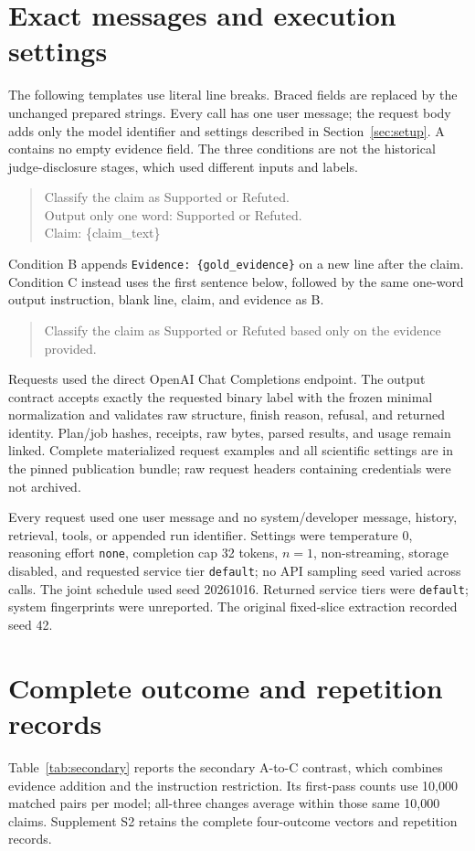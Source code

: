 \documentclass[11pt,letterpaper]{article}
\begin{document}

\clearpage
\appendix
\section{Exact messages and execution settings}\label{app:messages}
The following templates use literal line breaks. Braced fields are replaced by the unchanged prepared strings. Every call has one user message; the request body adds only the model identifier and settings described in Section~\ref{sec:setup}. A contains no empty evidence field. The three conditions are not the historical judge-disclosure stages, which used different inputs and labels.
\begin{quote}\small\ttfamily
Classify the claim as Supported or Refuted.\\
Output only one word: Supported or Refuted.\\[4pt]
Claim: \{claim\_text\}
\end{quote}
Condition B appends \texttt{Evidence: \{gold\_evidence\}} on a new line after the claim. Condition C instead uses the first sentence below, followed by the same one-word output instruction, blank line, claim, and evidence as B.
\begin{quote}\small\ttfamily
Classify the claim as Supported or Refuted based only on the evidence provided.
\end{quote}
Requests used the direct OpenAI Chat Completions endpoint. The output contract accepts exactly the requested binary label with the frozen minimal normalization and validates raw structure, finish reason, refusal, and returned identity. Plan/job hashes, receipts, raw bytes, parsed results, and usage remain linked. Complete materialized request examples and all scientific settings are in the pinned publication bundle; raw request headers containing credentials were not archived.

Every request used one user message and no system/developer message, history, retrieval, tools, or appended run identifier. Settings were temperature 0, reasoning effort \texttt{none}, completion cap 32 tokens, $n=1$, non-streaming, storage disabled, and requested service tier \texttt{default}; no API sampling seed varied across calls. The joint schedule used seed 20261016. Returned service tiers were \texttt{default}; system fingerprints were unreported. The original fixed-slice extraction recorded seed 42.

\section{Complete outcome and repetition records}\label{app:outcomes}
Table~\ref{tab:secondary} reports the secondary A-to-C contrast, which combines evidence addition and the instruction restriction. Its first-pass counts use 10,000 matched pairs per model; all-three changes average within those same 10,000 claims. Supplement S2 retains the complete four-outcome vectors and repetition records.
\end{document}
